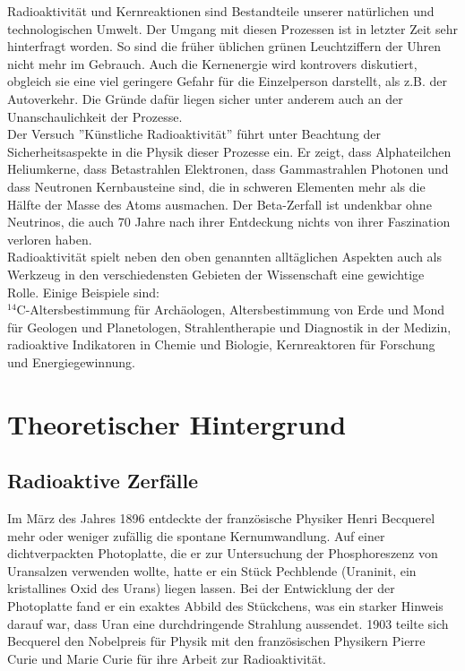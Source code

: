 Radioaktivität und Kernreaktionen sind Bestandteile unserer natürlichen und technologischen Umwelt. Der Umgang mit diesen Prozessen ist in letzter Zeit sehr hinterfragt worden. So sind die früher üblichen grünen Leuchtziffern der Uhren nicht mehr im Gebrauch. Auch die Kernenergie wird kontrovers diskutiert, obgleich sie eine viel geringere Gefahr für die Einzelperson darstellt, als z.B. der Autoverkehr. Die Gründe dafür liegen sicher unter anderem auch an der Unanschaulichkeit der Prozesse.\\
Der Versuch ''Künstliche Radioaktivität'' führt unter Beachtung der Sicherheitsaspekte in die Physik dieser Prozesse ein. Er zeigt, dass Alphateilchen Heliumkerne, dass Betastrahlen Elektronen, dass Gammastrahlen Photonen und dass Neutronen Kernbausteine sind, die in schweren Elementen mehr als die Hälfte der Masse des Atoms ausmachen. Der Beta-Zerfall ist undenkbar ohne Neutrinos, die auch 70 Jahre nach ihrer Entdeckung nichts von ihrer Faszination verloren haben.\\

\noindent
Radioaktivität spielt neben den oben genannten alltäglichen Aspekten auch als Werkzeug in den verschiedensten Gebieten der Wissenschaft eine gewichtige Rolle. Einige Beispiele sind:\\
$^{14}$C-Altersbestimmung für Archäologen, Altersbestimmung von Erde und Mond für Geologen und Planetologen, Strahlentherapie und Diagnostik in der Medizin, radioaktive Indikatoren in Chemie und Biologie, Kernreaktoren für Forschung und Energiegewinnung.

\section{Theoretischer Hintergrund}

\subsection{Radioaktive Zerfälle}

Im März des Jahres 1896 entdeckte der französische Physiker Henri Becquerel mehr oder weniger zufällig die spontane Kernumwandlung. Auf einer dichtverpackten Photoplatte, die er zur Untersuchung der Phosphoreszenz von Uransalzen verwenden wollte, hatte er ein Stück Pechblende (Uraninit, ein kristallines Oxid des Urans) liegen lassen. Bei der Entwicklung der der Photoplatte fand er ein exaktes Abbild des Stückchens, was ein starker Hinweis darauf war, dass Uran eine durchdringende Strahlung aussendet. 1903 teilte sich Becquerel den Nobelpreis für Physik mit den französischen Physikern Pierre Curie und Marie Curie für ihre Arbeit zur Radioaktivität.\\

